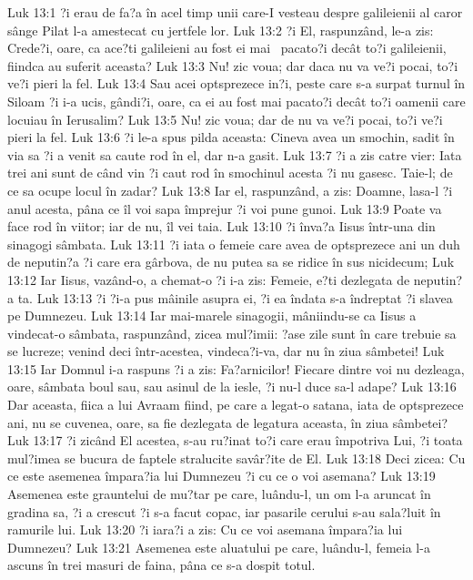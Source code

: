 Luk 13:1  ?i erau de fa?a în acel timp unii care-I vesteau despre galileienii al caror sânge Pilat l-a amestecat cu jertfele lor.
Luk 13:2  ?i El, raspunzând, le-a zis: Crede?i, oare, ca ace?ti galileieni au fost ei mai  pacato?i decât to?i galileienii, fiindca au suferit aceasta?
Luk 13:3  Nu! zic voua; dar daca nu va ve?i pocai, to?i ve?i pieri la fel.
Luk 13:4  Sau acei optsprezece in?i, peste care s-a surpat turnul în Siloam ?i i-a ucis, gândi?i, oare, ca ei au fost mai pacato?i decât to?i oamenii care locuiau în Ierusalim?
Luk 13:5  Nu! zic voua; dar de nu va ve?i pocai, to?i ve?i pieri la fel.
Luk 13:6  ?i le-a spus pilda aceasta: Cineva avea un smochin, sadit în via sa ?i a venit sa caute rod în el, dar n-a gasit.
Luk 13:7  ?i a zis catre vier: Iata trei ani sunt de când vin ?i caut rod în smochinul acesta ?i nu gasesc. Taie-l; de ce sa ocupe locul în zadar?
Luk 13:8  Iar el, raspunzând, a zis: Doamne, lasa-l ?i anul acesta, pâna ce îl voi sapa împrejur ?i voi pune gunoi.
Luk 13:9  Poate va face rod în viitor; iar de nu, îl vei taia.
Luk 13:10  ?i înva?a Iisus într-una din sinagogi sâmbata.
Luk 13:11  ?i iata o femeie care avea de optsprezece ani un duh de neputin?a ?i care era gârbova, de nu putea sa se ridice în sus nicidecum;
Luk 13:12  Iar Iisus, vazând-o, a chemat-o ?i i-a zis: Femeie, e?ti dezlegata de neputin?a ta.
Luk 13:13  ?i ?i-a pus mâinile asupra ei, ?i ea îndata s-a îndreptat ?i slavea pe Dumnezeu.
Luk 13:14  Iar mai-marele sinagogii, mâniindu-se ca Iisus a vindecat-o sâmbata, raspunzând, zicea mul?imii: ?ase zile sunt în care trebuie sa se lucreze; venind deci într-acestea, vindeca?i-va, dar nu în ziua sâmbetei!
Luk 13:15  Iar Domnul i-a raspuns ?i a zis: Fa?arnicilor! Fiecare dintre voi nu dezleaga, oare, sâmbata boul sau, sau asinul de la iesle, ?i nu-l duce sa-l adape?
Luk 13:16  Dar aceasta, fiica a lui Avraam fiind, pe care a legat-o satana, iata de optsprezece ani, nu se cuvenea, oare, sa fie dezlegata de legatura aceasta, în ziua sâmbetei?
Luk 13:17  ?i zicând El acestea, s-au ru?inat to?i care erau împotriva Lui, ?i toata mul?imea se bucura de faptele stralucite savâr?ite de El.
Luk 13:18  Deci zicea: Cu ce este asemenea împara?ia lui Dumnezeu ?i cu ce o voi asemana?
Luk 13:19  Asemenea este grauntelui de mu?tar pe care, luându-l, un om l-a aruncat în gradina sa, ?i a crescut ?i s-a facut copac, iar pasarile cerului s-au sala?luit în ramurile lui.
Luk 13:20  ?i iara?i a zis: Cu ce voi asemana împara?ia lui Dumnezeu?
Luk 13:21  Asemenea este aluatului pe care, luându-l, femeia l-a ascuns în trei masuri de faina, pâna ce s-a dospit totul.
